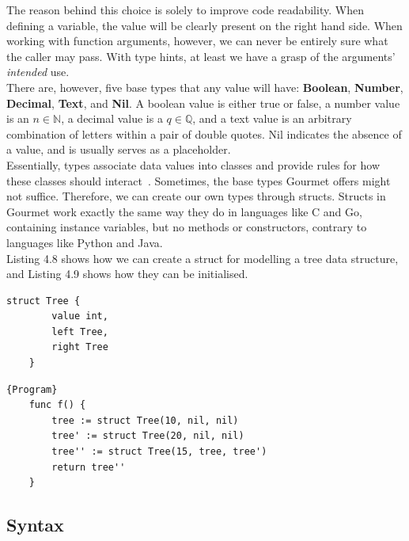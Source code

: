 The reason behind this choice is solely to improve code readability. When defining a variable, the value will be clearly present on the right hand side. When working with function arguments, however, we can never be entirely sure what the caller may pass. With type hints, at least we have a grasp of the arguments' \textit{intended} use. \hfill \\

There are, however, five base types that any value will have: \textbf{Boolean}, \textbf{Number}, \textbf{Decimal}, \textbf{Text}, and \textbf{Nil}. A boolean value is either true or false, a number value is an  $n \in \mathbb{N}$, a decimal value is a $q \in \mathbb{Q}$, and a text value is an arbitrary combination of letters within a pair of double quotes. Nil indicates the absence of a value, and is usually serves as a placeholder. \hfill \\

Essentially, types associate data values into classes and provide rules for how these classes should interact~\cite{pierce2002types, LYAH}. Sometimes, the base types Gourmet offers might not suffice. Therefore, we can create our own types through structs. Structs in Gourmet work exactly the same way they do in languages like C and Go, containing instance variables, but no methods or constructors, contrary to languages like Python and Java. \hfill \\

Listing 4.8 shows how we can create a struct for modelling a tree data structure, and Listing 4.9 shows how they can be initialised. \hfill \\

\begin{lstlisting}[caption={A Gourmet struct Tree, with instance variables value, left and right}, captionpos=b, frame=tlrb]
    struct Tree {
        value int,
        left Tree,
        right Tree
    }
\end{lstlisting}

\begin{lstlisting}[caption=A function to initialise three tree structs and return the last one,captionpos=b, frame=tlrb]{Program}
    func f() {
        tree := struct Tree(10, nil, nil)
        tree' := struct Tree(20, nil, nil)
        tree'' := struct Tree(15, tree, tree')
        return tree''
    }
\end{lstlisting}

\subsection{Syntax}

